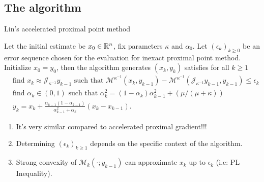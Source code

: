 \documentclass[11pt]{beamer}
\begin{document}
        \subsection{The algorithm}
            \begin{frame}{Lin's accelerated proximal point method}
                \begin{definition}
                    Let the initial estimate be $x_0 \in \mathbb R^n$, fix parameters $\kappa$ and $\alpha_0$. 
                    Let $(\epsilon_k)_{k \ge 0}$ be an error sequence chosen for the evaluation for inexact proximal point method. 
                    Initialize $x_0 = y_0$, then the algorithm generates $(x_k, y_k)$ satisfies for all $k \ge 1$
                    {\small
                    \begin{align*}
                        & \text{find } x_k \approx \mathcal J_{\kappa^{-1}} y_{k - 1} \text{ such that } \mathcal M^{\kappa^{-1}}(x_k, y_{k - 1}) - \mathcal M^{\kappa^{-1}}(\mathcal J_{\kappa^{-1}}y_{k - 1}, y_{k - 1}) \le \epsilon_k
                        \\
                        & \text{find } \alpha_k \in (0, 1) \text{ such that } \alpha_k^2 = (1 - \alpha_k)\alpha_{k - 1}^2 + (\mu/(\mu + \kappa)) 
                        \\
                        & 
                        y_{k} = x_k + \frac{\alpha_{k - 1}(1 - \alpha_{k - 1})}{\alpha_{k - 1}^2 + \alpha_k}(x_k - x_{k - 1}). 
                    \end{align*}
                    }
                \end{definition}
                \pause
                \begin{enumerate}
                    \item It's very similar compared to accelerated proximal gradient!!!
                    \item Determining $(\epsilon_k)_{k \ge 1}$ depends on the specific context of the algorithm. 
                    \item Strong convexity of $\mathcal M_k(\cdot; y_{k - 1})$ can approximate $x_k$ up to $\epsilon_k$ (i.e: PL Inequality). 
                \end{enumerate}
            \end{frame}
\end{document}
